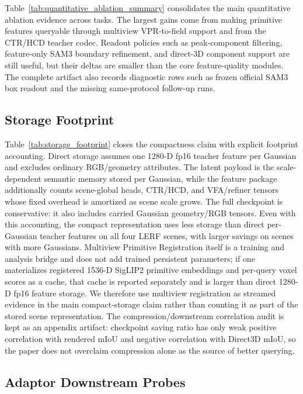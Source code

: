 \documentclass[10pt,twocolumn,letterpaper]{article}
\begin{document}
Table~\ref{tab:quantitative_ablation_summary} consolidates the main quantitative
ablation evidence across tasks. The largest gains come from making primitive
features queryable through multiview VPR-to-field support and from the CTR/HCD
teacher codec. Readout policies such as peak-component filtering, feature-only
SAM3 boundary refinement, and direct-3D component support are still useful, but
their deltas are smaller than the core feature-quality modules. The complete
artifact also records diagnostic rows such as frozen official SAM3 box readout
and the missing same-protocol follow-up runs.

\subsection{Storage Footprint}



Table~\ref{tab:storage_footprint} closes the compactness claim with explicit
footprint accounting. Direct storage assumes one 1280-D fp16 teacher feature per
Gaussian and excludes ordinary RGB/geometry attributes. The latent payload is
the scale-dependent semantic memory stored per Gaussian, while the feature
package additionally counts scene-global heads, CTR/HCD, and VFA/refiner tensors
whose fixed overhead is amortized as scene scale grows. The full checkpoint is
conservative: it also includes carried Gaussian geometry/RGB tensors. Even with
this accounting, the compact representation uses less storage than direct
per-Gaussian teacher features on all four LERF scenes, with larger savings on
scenes with more Gaussians. Multiview Primitive Registration itself is a
training and analysis bridge and does not add trained persistent parameters; if
one materializes registered 1536-D SigLIP2 primitive embeddings and per-query
voxel scores as a cache, that cache is reported separately and is larger than
direct 1280-D fp16 feature storage. We therefore use multiview registration as
streamed evidence in the main compact-storage claim rather than counting it as
part of the stored scene representation.
The compression/downstream correlation audit is kept as an appendix artifact:
checkpoint saving ratio has only weak positive correlation with rendered mIoU
and negative correlation with Direct3D mIoU, so the paper does not overclaim
compression alone as the source of better querying.

\subsection{Adaptor Downstream Probes}
\end{document}
